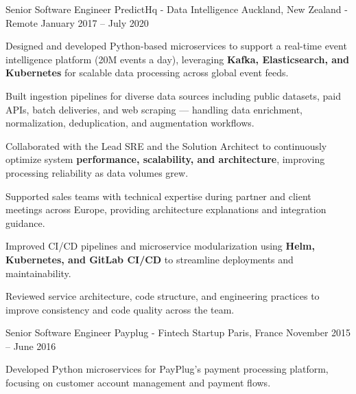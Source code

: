 \begin{cventries}
  \cventry
    {Senior Software Engineer} %
    {PredictHq - Data Intelligence} %
    {Auckland, New Zealand - Remote} %
    {January 2017 – July 2020} %
    {
      \begin{cvitems} %
        \item {Designed and developed Python-based microservices to support a real-time event intelligence platform (20M events a day), leveraging \textbf{Kafka, Elasticsearch, and Kubernetes} for scalable data processing across global event feeds.}
        \item {Built ingestion pipelines for diverse data sources including public datasets, paid APIs, batch deliveries, and web scraping — handling data enrichment, normalization, deduplication, and augmentation workflows.}
        \item {Collaborated with the Lead SRE and the Solution Architect to continuously optimize system \textbf{performance, scalability, and architecture}, improving processing reliability as data volumes grew.}
        \item {Supported sales teams with technical expertise during partner and client meetings across Europe, providing architecture explanations and integration guidance.}
        \item {Improved CI/CD pipelines and microservice modularization using \textbf{Helm, Kubernetes, and GitLab CI/CD} to streamline deployments and maintainability.}
        \item {Reviewed service architecture, code structure, and engineering practices to improve consistency and code quality across the team.}
      \end{cvitems}
    }

  \cventry
    {Senior Software Engineer} %
    {Payplug - Fintech Startup} %
    {Paris, France} %
    {November 2015 – June 2016} %
    {
      \begin{cvitems} %
        \item {Developed Python microservices for PayPlug's payment processing platform, focusing on customer account management and payment flows.}
      \end{cvitems}
    }


\end{cventries}
